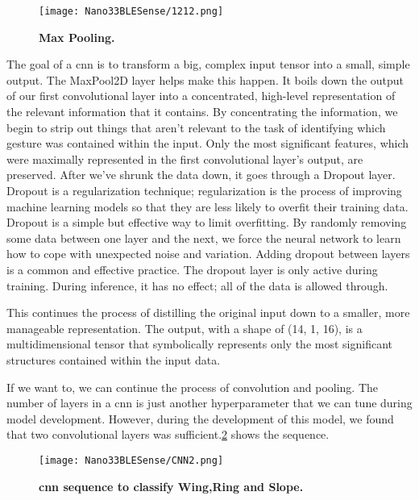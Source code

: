 \begin{figure}[h!]
    \texttt{[image: Nano33BLESense/1212.png]}
    \caption{\textbf{Max Pooling. \cite{Warden:2020}}}
    \label{fig:1212}
\end{figure}

The goal of a \ac{cnn} is to transform a big, complex input tensor into a small, simple output.
The MaxPool2D layer helps make this happen. It boils down the output of our first
convolutional layer into a concentrated, high-level representation of the relevant
information that it contains.
By concentrating the information, we begin to strip out things that aren't relevant to
the task of identifying which gesture was contained within the input. Only the most
significant features, which were maximally represented in the first convolutional
layer's output, are preserved.
After we've shrunk the data down, it goes through a Dropout layer. Dropout is a regularization technique; regularization is the process of improving machine learning models so that they are less likely to overfit their training data. Dropout is a simple but effective way to limit overfitting.
By randomly removing some data between one layer and the next, we force the neural
network to learn how to cope with unexpected noise and variation. Adding dropout
between layers is a common and effective practice. The dropout layer is only active during training. During inference, it has no effect; all of the data is allowed through. \cite{Warden:2020}

This continues the process of distilling the original input down to a smaller, more
manageable representation. The output, with a shape of (14, 1, 16), is a multidimensional
tensor that symbolically represents only the most significant structures
contained within the input data.

If we want to, we can continue the process of convolution and pooling. The
number of layers in a \ac{cnn} is just another hyperparameter that we can tune during model development. However, during the development of this model, we found that two convolutional layers was sufficient.\ref{fig:CNN2} shows the sequence.

\begin{figure}[h!]
    \texttt{[image: Nano33BLESense/CNN2.png]}
    \caption{\textbf{\ac{cnn} sequence to classify Wing,Ring and Slope.}}
    \label{fig:CNN2}
\end{figure}

